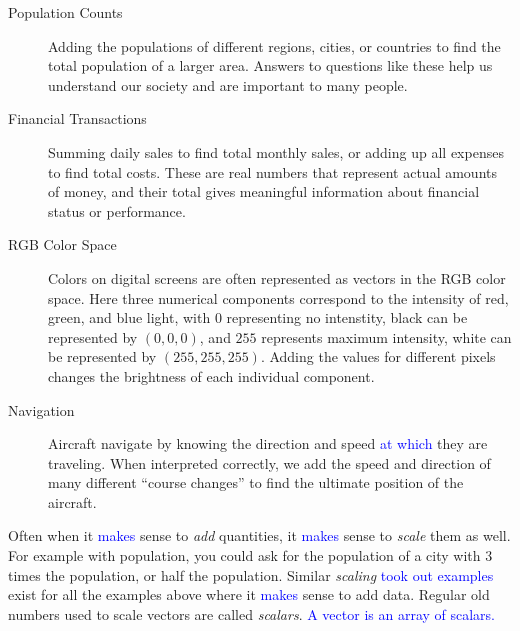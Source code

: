 \documentclass{ximera}
\begin{document}
\begin{concept}
\begin{description}
\item[Population Counts] Adding the populations of different regions,
  cities, or countries to find the total population of a larger
  area. Answers to questions like these help us understand our
  society and are important to many people.
\item[Financial Transactions] Summing daily sales to find total
  monthly sales, or adding up all expenses to find total costs. These
  are real numbers that represent actual amounts of money, and their
  total gives meaningful information about financial status or
  performance.
\item[RGB Color Space] Colors on digital screens are often represented
  as vectors in the RGB color space. Here three numerical components
  correspond to the intensity of red, green, and blue light, with $0$
  representing no intenstity, black can be represented by $(0,0,0)$,
  and $255$ represents maximum intensity, white can be represented by
  $(255,255,255)$.  Adding the values for different pixels changes the
  brightness of each individual component.
\item[Navigation] Aircraft navigate by knowing the direction and speed \textcolor{blue}{at which}
  they are traveling. When interpreted correctly, we add the
  speed and direction of many different ``course changes'' to
  find the ultimate position of the aircraft.
\end{description}
\end{concept}
Often when it \textcolor{blue}{makes} sense to \textit{add} quantities, it \textcolor{blue}{makes} sense to
\textit{scale} them as well. For example with population, you could
ask for the population of a city with $3$ times the population, or
half the population. Similar \textit{scaling} \textcolor{blue}{took out examples} exist for all
the examples above where it \textcolor{blue}{makes} sense to add data. Regular old
numbers used to scale vectors are called \textit{scalars}. \textcolor{blue}{A vector is an array of scalars.}
\end{document}
